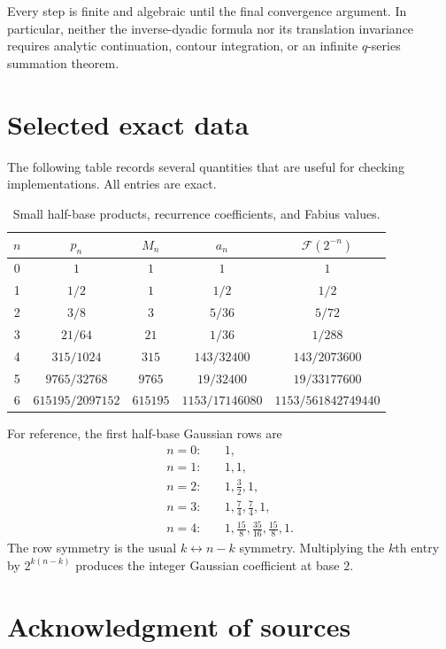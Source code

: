 \documentclass[11pt,oneside]{article}
\theoremstyle{definition}
\theoremstyle{remark}
\newcommand{\F}{\mathcal F}
\begin{document}
Every step is finite and algebraic until the final convergence argument.  In
particular, neither the inverse-dyadic formula nor its translation invariance
requires analytic continuation, contour integration, or an infinite
$q$-series summation theorem.

\section{Selected exact data}

The following table records several quantities that are useful for checking
implementations.  All entries are exact.

\begin{table}[H]
\centering
\caption{Small half-base products, recurrence coefficients, and Fabius values.}
\label{p3:tab:exactdata}
\begin{tabular}{@{}ccccc@{}}
\toprule
$n$ & $p_n$ & $M_n$ & $a_n$ & $\F(2^{-n})$\\
\midrule
0 & $1$ & $1$ & $1$ & $1$\\
1 & $1/2$ & $1$ & $1/2$ & $1/2$\\
2 & $3/8$ & $3$ & $5/36$ & $5/72$\\
3 & $21/64$ & $21$ & $1/36$ & $1/288$\\
4 & $315/1024$ & $315$ & $143/32400$ & $143/2073600$\\
5 & $9765/32768$ & $9765$ & $19/32400$ & $19/33177600$\\
6 & $615195/2097152$ & $615195$ & $1153/17146080$ & $1153/561842749440$\\
\bottomrule
\end{tabular}
\end{table}

For reference, the first half-base Gaussian rows are
\begin{align*}
 n=0:&\quad 1,\\
 n=1:&\quad 1,1,\\
 n=2:&\quad 1,\frac32,1,\\
 n=3:&\quad 1,\frac74,\frac74,1,\\
 n=4:&\quad 1,\frac{15}{8},\frac{35}{16},\frac{15}{8},1.
\end{align*}
The row symmetry is the usual $k\leftrightarrow n-k$ symmetry.  Multiplying
the $k$th entry by $2^{k(n-k)}$ produces the integer Gaussian coefficient at
base $2$.

\section*{Acknowledgment of sources}
\end{document}
